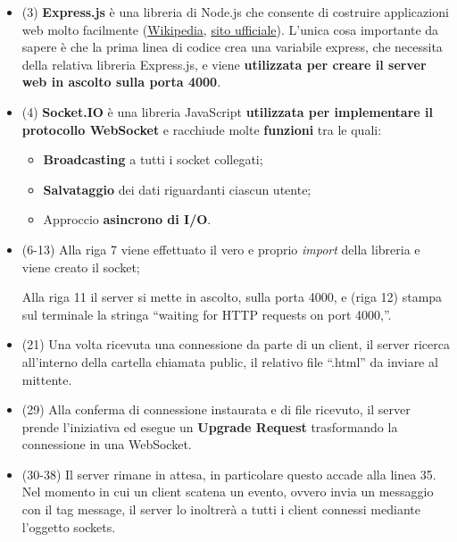 \documentclass[a4paper]{article}
\newcommand{\dquotes}[1]{``#1''}
\begin{document}
	
	
	\begin{itemize}
		\item (3) \textcolor{Red3}{\textbf{Express.js}} è una libreria di Node.js che consente di costruire applicazioni web molto facilmente (\href{https://en.wikipedia.org/wiki/Express.js}{Wikipedia}, \href{https://expressjs.com/}{sito ufficiale}). L'unica cosa importante da sapere è che la prima linea di codice crea una variabile \textsf{express}, che necessita della relativa libreria Express.js, e viene \textbf{utilizzata per creare il server web in ascolto sulla porta 4000}.
		
		\item (4) \textcolor{Red3}{\textbf{Socket.IO}} è una libreria JavaScript \textbf{utilizzata per implementare il protocollo WebSocket} e racchiude molte \textbf{funzioni} tra le quali:
		\begin{itemize}
			\item \textbf{Broadcasting} a tutti i socket collegati;
			
			\item \textbf{Salvataggio} dei dati riguardanti ciascun utente;
			
			\item Approccio \textbf{asincrono di I/O}.
		\end{itemize}
	
		\item (6-13) Alla riga 7 viene effettuato il vero e proprio \emph{import} della libreria e viene creato il socket;
		
		Alla riga 11 il server si mette in ascolto, sulla porta 4000, e (riga 12) stampa sul terminale la stringa \dquotes{waiting for HTTP requests on port 4000,}.
		
		
		\item (21) Una volta ricevuta una connessione da parte di un client, il server ricerca all'interno della cartella chiamata \textsf{public}, il relativo file \dquotes{.html} da inviare al mittente.
		
		\item (29) Alla conferma di connessione instaurata e di file ricevuto, il server prende l'iniziativa ed esegue un \textbf{Upgrade Request} trasformando la connessione in una WebSocket.
		
		\item (30-38) Il server rimane in attesa, in particolare questo accade alla linea 35. Nel momento in cui un client scatena un evento, ovvero invia un messaggio con il tag \textsf{message}, il server lo inoltrerà a tutti i client connessi mediante l'oggetto \textsf{sockets}.
	\end{itemize}
\end{document}
